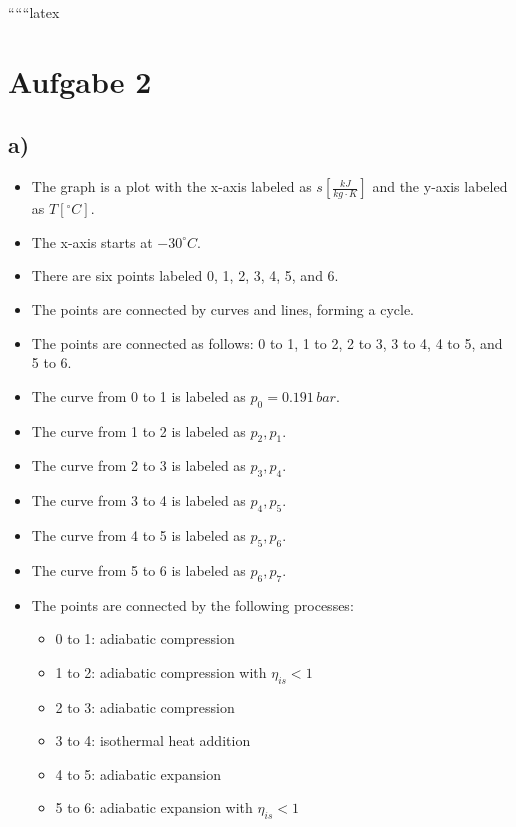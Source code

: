 
``````latex


\section*{Aufgabe 2}

\subsection*{a)}

\begin{itemize}
    \item The graph is a plot with the x-axis labeled as $s \left[ \frac{kJ}{kg \cdot K} \right]$ and the y-axis labeled as $T \left[ ^\circ C \right]$.
    \item The x-axis starts at $-30^\circ C$.
    \item There are six points labeled 0, 1, 2, 3, 4, 5, and 6.
    \item The points are connected by curves and lines, forming a cycle.
    \item The points are connected as follows: 0 to 1, 1 to 2, 2 to 3, 3 to 4, 4 to 5, and 5 to 6.
    \item The curve from 0 to 1 is labeled as $p_0 = 0.191 \, bar$.
    \item The curve from 1 to 2 is labeled as $p_2, p_1$.
    \item The curve from 2 to 3 is labeled as $p_3, p_4$.
    \item The curve from 3 to 4 is labeled as $p_4, p_5$.
    \item The curve from 4 to 5 is labeled as $p_5, p_6$.
    \item The curve from 5 to 6 is labeled as $p_6, p_7$.
    \item The points are connected by the following processes:
        \begin{itemize}
            \item 0 to 1: adiabatic compression
            \item 1 to 2: adiabatic compression with $\eta_{is} < 1$
            \item 2 to 3: adiabatic compression
            \item 3 to 4: isothermal heat addition
            \item 4 to 5: adiabatic expansion
            \item 5 to 6: adiabatic expansion with $\eta_{is} < 1$
        \end{itemize}
\end{itemize}


